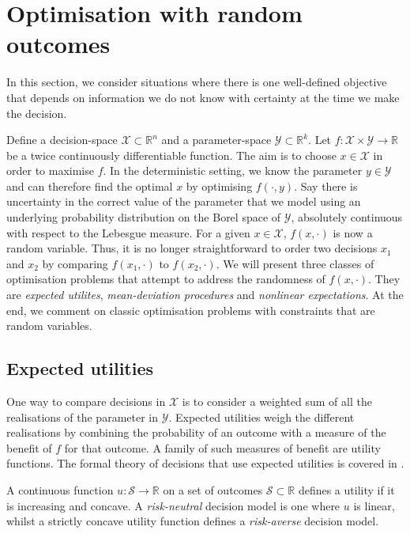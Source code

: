 \documentclass[main.tex]{subfiles}
\begin{document}
\section{Optimisation with random outcomes}\label{sec:one_optim_random_outcomes}
In this section, we consider situations where there is one
well-defined objective that depends on  information we do not know
with certainty at the time we make the decision.

Define a decision-space $\mathcal{X}\subset \mathbb R^n$ and a
parameter-space $\mathcal{Y}\subset \mathbb R^k$.
Let $f:\mathcal{X}\times\mathcal{Y}\to\mathbb R$ be a twice continuously
differentiable function.
The aim is to choose $x\in\mathcal{X}$ in order to maximise $f$.
In the deterministic setting, we know the parameter
$y\in\mathcal{Y}$ and can therefore find the optimal $x$ by optimising
$f(\cdot,y)$.
Say there is uncertainty in the correct value of the parameter that
we model using an underlying probability distribution
on the Borel space of $\mathcal{Y}$, absolutely continuous with respect
to the Lebesgue measure.
For a given $x\in\mathcal{X}$, $f(x,\cdot)$ is now a random variable.
Thus, it is no longer straightforward to order two decisions $x_1$ and
$x_2$ by comparing $f(x_1,\cdot)$ to $f(x_2,\cdot)$.
We will present three classes of optimisation problems that attempt to
address the randomness of $f(x,\cdot)$. They are \emph{expected
  utilites}, \emph{mean-deviation procedures} and \emph{nonlinear
  expectations}.
At the end, we comment on classic optimisation problems with constraints
that are random variables.

\subsection{Expected utilities}
One way to compare decisions in $\mathcal{X}$ is to consider a weighted
sum of all the realisations of the parameter in $\mathcal{Y}$.
Expected utilities weigh the different realisations by combining the
probability of an outcome with a measure of the benefit of $f$ for that
outcome.
A family of such measures of benefit are utility functions. The formal
theory of decisions that use expected utilities is covered in
\citep[Ch.~2]{follmer2004stochastic}.
\begin{mydef}
  A continuous function $u:\mathcal S\to\mathbb R$ on a set of outcomes
  $\mathcal S\subset \mathbb R$ defines a utility if
  it is increasing and concave.
  A \emph{risk-neutral} decision
  model is one where $u$ is linear, whilst a strictly concave utility function defines a
  \emph{risk-averse} decision model.
\end{mydef}
\end{document}
